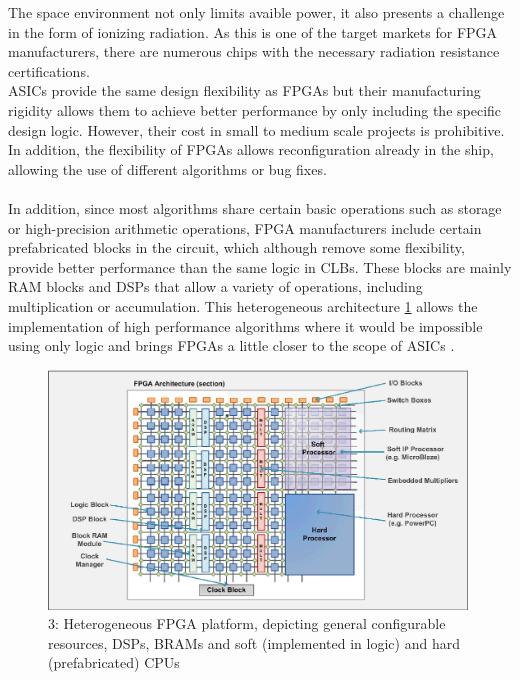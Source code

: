 The space environment not only limits avaible power, it also presents a challenge in the form of ionizing radiation. As this is one of the target markets for FPGA manufacturers, there are numerous chips with the necessary radiation resistance certifications.
\\
ASICs provide the same design flexibility as FPGAs but their manufacturing rigidity allows them to achieve better performance by only including the specific design logic. However, their cost in small to medium scale projects is prohibitive. In addition, the flexibility of FPGAs allows reconfiguration already in the ship, allowing the use of different algorithms or bug fixes.
\\
\\
In addition, since most algorithms share certain basic operations such as storage or high-precision arithmetic operations, FPGA manufacturers include certain prefabricated blocks in the circuit, which although remove some flexibility, provide better performance than the same logic in CLBs. These blocks are mainly RAM blocks and DSPs that allow a variety of operations, including multiplication or accumulation. This heterogeneous architecture \ref{fig:heterogenea} allows the implementation of high performance algorithms where it would be impossible using only logic and brings FPGAs a little closer to the scope of ASICs \cite{zhou_efficient_2013}.
\\
\begin{figure}[h!]
\centering
\includegraphics[height=2.5in]{figures/FPGA_heterogenea.png}
\caption{3: Heterogeneous FPGA platform, depicting general configurable resources, DSPs, BRAMs and soft (implemented in logic) and hard (prefabricated) CPUs}
  \label{fig:heterogenea}
\end{figure}
\\

